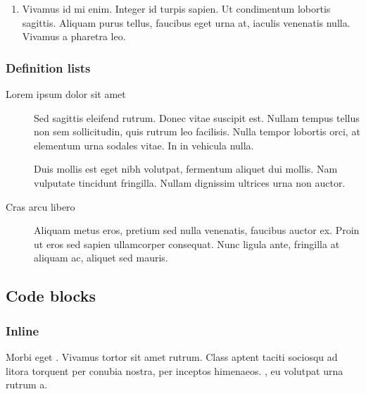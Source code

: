 \documentclass[letterpaper,10pt,english]{sphinxmanual}
\begin{document}
\begin{enumerate}
\item {} 
Vivamus id mi enim. Integer id turpis sapien. Ut condimentum lobortis
sagittis. Aliquam purus tellus, faucibus eget urna at, iaculis venenatis
nulla. Vivamus a pharetra leo.

\end{enumerate}


\subsubsection{Definition lists}
\label{\detokenize{markdown:definition-lists}}
\begin{description}
\item[{Lorem ipsum dolor sit amet}] \leavevmode
Sed sagittis eleifend rutrum. Donec vitae suscipit est. Nullam tempus
tellus non sem sollicitudin, quis rutrum leo facilisis. Nulla tempor
lobortis orci, at elementum urna sodales vitae. In in vehicula nulla.

Duis mollis est eget nibh volutpat, fermentum aliquet dui mollis. Nam
vulputate tincidunt fringilla. Nullam dignissim ultrices urna non
auctor.

\item[{Cras arcu libero}] \leavevmode
Aliquam metus eros, pretium sed nulla venenatis, faucibus auctor ex.
Proin ut eros sed sapien ullamcorper consequat. Nunc ligula ante,
fringilla at aliquam ac, aliquet sed mauris.

\end{description}


\subsection{Code blocks}
\label{\detokenize{markdown:code-blocks}}

\subsubsection{Inline}
\label{\detokenize{markdown:inline}}
Morbi eget . Vivamus  tortor sit amet
rutrum. Class aptent taciti sociosqu ad litora torquent per conubia nostra,
per inceptos himenaeos. {\hyperref[\detokenize{markdown:}]{\emph{}}}, eu volutpat urna
rutrum a.
\end{document}
